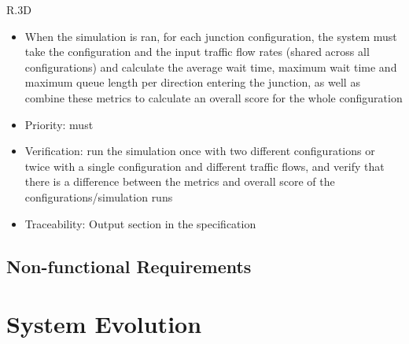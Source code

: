 \documentclass{article}
\begin{document}
R.3D
\begin{itemize}
  \item When the simulation is ran, for each junction configuration, the system must take the configuration and the input traffic flow rates (shared across all configurations) and calculate the average wait time, maximum wait time and maximum queue length per direction entering the junction, as well as combine these metrics to calculate an overall score for the whole configuration
  \item Priority: must
  \item Verification: run the simulation once with two different configurations or twice with a single configuration and different traffic flows, and verify that there is a difference between the metrics and overall score of the configurations/simulation runs
  \item Traceability: Output section in the specification
\end{itemize}
\subsection{Non-functional Requirements}

\section{System Evolution}
\end{document}
